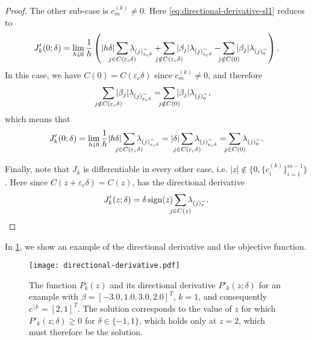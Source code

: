 \begin{proof}
  The other sub-case is \(c_m^{(k)} \neq 0\). Here
  \eqref{eq:directional-derivative-sl1} reduces to
  \begin{equation*}
    J_k'(0; \delta) = \lim_{h \downarrow 0}
    \frac{1}{h}
    \left(
      |h \delta| \smashoperator{\sum_{j \in C({\varepsilon_c}\delta)}} \lambda_{(j)^-_{{\varepsilon_c}\delta}}
      + \smashoperator{\sum_{j \notin C({\varepsilon_c}\delta)}} |\beta_j| \lambda_{(j)^-_{{\varepsilon_c}\delta}}
      - \smashoperator{\sum_{j \notin C(0)}} |\beta_j| \lambda_{(j)^-_{0}}
    \right).
  \end{equation*}
  In this case, we have \(C(0) = C({\varepsilon_c}\delta)\) since \(c_m^{(k)}
  \neq 0\), and therefore
  \[
    \smashoperator{\sum_{j \notin C({\varepsilon_c}\delta)}} |\beta_j| \lambda_{(j)^-_{{\varepsilon_c}\delta}}
    = \smashoperator{\sum_{j \notin C(0)}} |\beta_j| \lambda_{(j)^-_{0}},
  \]
  which means that
  \begin{equation*}
    J_k'(0; \delta) = \lim_{h \downarrow 0}
    \frac{1}{h}
    |h \delta| \smashoperator{\sum_{j \in C({\varepsilon_c}\delta)}} \lambda_{(j)^-_{{\varepsilon_c}\delta}}
    = |\delta|\smashoperator{\sum_{j \in C({\varepsilon_c}\delta)}} \lambda_{(j)^-_{{\varepsilon_c}\delta}}
    = \smashoperator{\sum_{j \in C(0)}} \lambda_{(j)^-_{0}}.
  \end{equation*}

  Finally, note that \(J_k\) is differentiable in every other case, i.e.
  \(|z| \notin \{0, \{c_i^{(k)}\}_{i=1}^{m-1}\}\). Here since \(C(z +
  {\varepsilon_c}\delta) = C(z)\), has the directional derivative
  \[
    J_k'(z; \delta) = \delta \sign(z) \smashoperator{\sum_{j \in C(z)}} \lambda_{(j)^-_{z}}.
  \]
\end{proof}

In \cref{fig:directional-derivative}, we show an example of the directional
derivative and the objective function.

\begin{figure}[htpb]
  \centering
  \texttt{[image: directional-derivative.pdf]}
  \caption{%
    The function \(P_k(z)\) and its directional derivative \(P'_k(z; \delta)\) for
    an example with \(\beta = [-3.0, 1.0, 3.0, 2.0]^T\), \(k = 1\), and consequently
    \(c^{\setminus k} = [2, 1]^T\). The solution corresponds to the value of \(z\) for
    which \(P'_k(z; \delta) \geq 0 \) for \(\delta \in \{-1, 1\}\), which holds only
    at \(z = 2\), which must therefore be the solution.
    }
  \label{fig:directional-derivative}
\end{figure}

